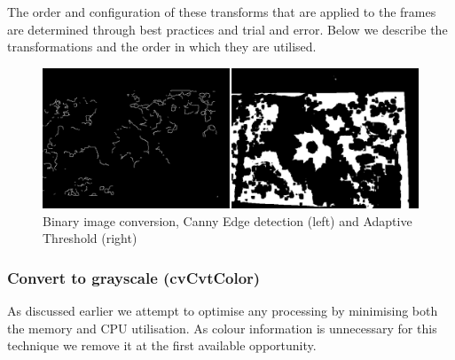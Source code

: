 The order and configuration of these transforms that are applied to the frames are determined through best practices and  trial and error. Below we describe the transformations and the order in which they are utilised.

\begin{figure}
\centering
    \includegraphics[width=1.0\textwidth]{leaf_identification/images/convert_to_binary.png}
    \caption{Binary image conversion, Canny Edge detection (left) and Adaptive Threshold (right)}%
    \label{preprocessing}
\end{figure}


\subsubsection{Convert to grayscale (cvCvtColor)}
As discussed earlier we attempt to optimise any processing by minimising both the memory and CPU utilisation. As colour information is unnecessary for this technique we remove it at the first available opportunity.

